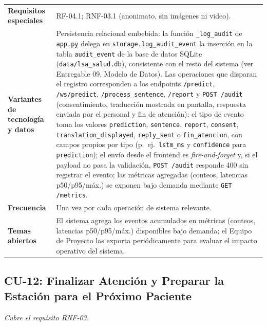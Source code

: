 \begin{longtable}{@{}>{\raggedright\arraybackslash}p{4.1cm} >{\raggedright\arraybackslash}p{\dimexpr\textwidth-4.1cm-2\tabcolsep\relax}@{}}
\textbf{Requisitos especiales} & RF-04.1; RNF-03.1 (anonimato, sin imágenes ni video). \\
\textbf{Variantes de tecnología y datos} &
Persistencia relacional embebida: la función \texttt{\_log\_audit} de
\texttt{app.py} delega en \texttt{storage.log\_audit\_event} la inserción en
la tabla \texttt{audit\_event} de la base de datos SQLite
(\texttt{data/lsa\_salud.db}), consistente con el resto del sistema (ver
Entregable 09, Modelo de Datos). Las
operaciones que disparan el registro corresponden a los endpoints
\texttt{/predict}, \texttt{/ws/predict}, \texttt{/process\_sentence},
\texttt{/report} y \texttt{POST /audit} (consentimiento, traducción
mostrada en pantalla, respuesta enviada por el personal y fin de
atención); el tipo de evento toma los valores
\texttt{prediction}, \texttt{sentence}, \texttt{report}, \texttt{consent},
\texttt{translation\_displayed}, \texttt{reply\_sent} o
\texttt{fin\_atencion}, con campos
propios por tipo (p.\ ej.\ \texttt{lstm\_ms} y \texttt{confidence} para
\texttt{prediction}); el envío desde el frontend es \textit{fire-and-forget}
y, si el payload no pasa la validación, \texttt{POST /audit} responde 400
sin registrar el evento; las métricas agregadas (conteos, latencias
p50/p95/máx.) se exponen bajo demanda mediante \texttt{GET /metrics}. \\
\textbf{Frecuencia} & Una vez por cada operación de sistema relevante. \\
\textbf{Temas abiertos} &
El sistema agrega los eventos acumulados en métricas (conteos, latencias
p50/p95/máx.) disponibles bajo demanda; el Equipo de Proyecto las exporta
periódicamente para evaluar el impacto operativo del sistema. \\
\bottomrule
\end{longtable}

\subsection{CU-12: Finalizar Atención y Preparar la Estación para el Próximo Paciente}
\textit{Cubre el requisito RNF-03.}

